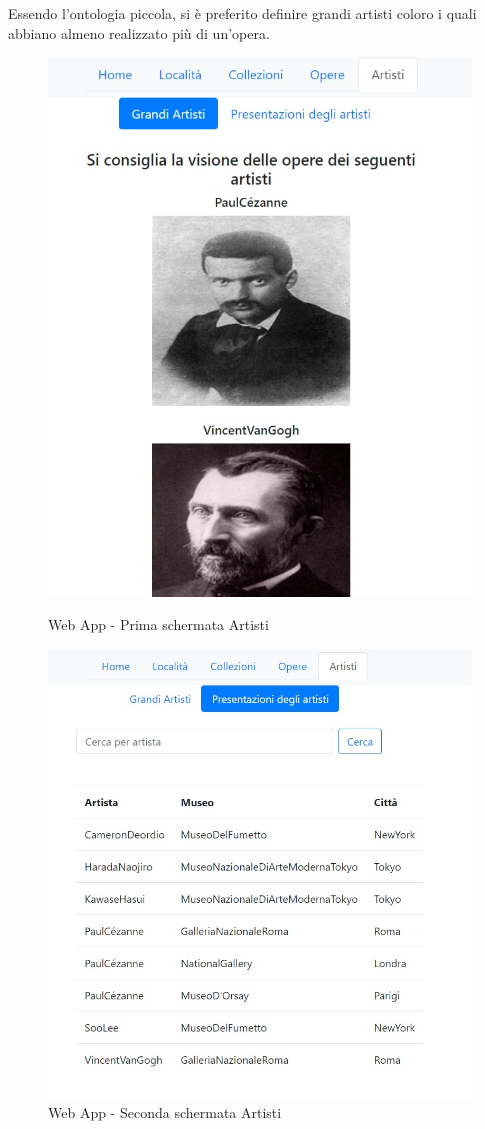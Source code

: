 \documentclass[12pt]{article}
\begin{document}
Essendo l’ontologia piccola, si è preferito definire grandi artisti coloro i quali abbiano almeno realizzato più di un’opera.

\begin{figure}[!p]
   \centering
   \includegraphics[scale=0.5]{fig/Schermata 5.1 webapp.jpeg}
   \caption{Web App - Prima schermata Artisti}\label{fig:picture}
      \includegraphics[scale=0.5]{fig/Schermata 5.2 webapp.jpeg}
   \caption{Web App - Seconda schermata Artisti}\label{fig:picture}
\end{figure}
\end{document}
